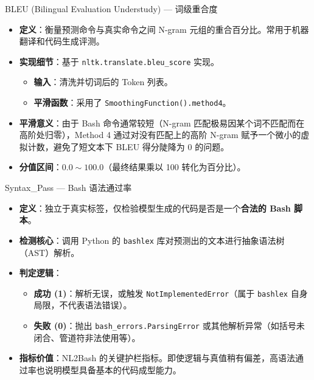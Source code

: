 \documentclass[aspectratio=169]{beamer}
\begin{document}
\begin{frame}{BLEU (Bilingual Evaluation Understudy) — 词级重合度}
    \begin{itemize}
        \item \textbf{定义}：衡量预测命令与真实命令之间 N-gram 元组的重合百分比。常用于机器翻译和代码生成评测。
        \item \textbf{实现细节}：基于 \texttt{nltk.translate.bleu\_score} 实现。
        \begin{itemize}
            \item \textbf{输入}：清洗并切词后的 Token 列表。
            \item \textbf{平滑函数}：采用了 \texttt{SmoothingFunction().method4}。
        \end{itemize}
        \item \textbf{平滑意义}：由于 Bash 命令通常较短（N-gram 匹配极易因某个词不匹配而在高阶处归零），Method 4 通过对没有匹配上的高阶 N-gram 赋予一个微小的虚拟计数，避免了短文本下 BLEU 得分陡降为 0 的问题。
        \item \textbf{分值区间}：$0.0 \sim 100.0$（最终结果乘以 100 转化为百分比）。
    \end{itemize}
\end{frame}

\begin{frame}{Syntax\_Pass — Bash 语法通过率}
    \begin{itemize}
        \item \textbf{定义}：独立于真实标签，仅检验模型生成的代码是否是一个\textbf{合法的 Bash 脚本}。
        \item \textbf{检测核心}：调用 Python 的 \texttt{bashlex} 库对预测出的文本进行抽象语法树（AST）解析。
        \item \textbf{判定逻辑}：
        \begin{itemize}
            \item \textbf{成功 (1)}：解析无误，或触发 \texttt{NotImplementedError}（属于 \texttt{bashlex} 自身局限，不代表语法错误）。
            \item \textbf{失败 (0)}：抛出 \texttt{bash\_errors.ParsingError} 或其他解析异常（如括号未闭合、管道符非法使用等）。
        \end{itemize}
        \item \textbf{指标价值}：NL2Bash 的关键护栏指标。即使逻辑与真值稍有偏差，高语法通过率也说明模型具备基本的代码成型能力。
    \end{itemize}
\end{frame}
\end{document}
